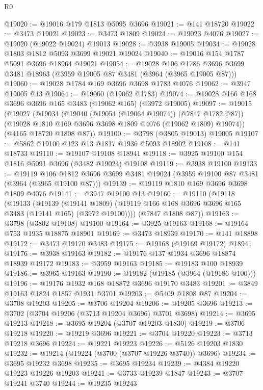 \begin{lexlean}{R0}
\begin{coremodule}
@19020 := @19016 @179 @1813 @5095 @3696
@19021 := @141 @18720
@19022 := @3473 @19021
@19023 := @3473 @1809
@19024 := @19023 @4076
@19027 := @19020 (@19022 @19024) @19013
@19028 := @3938 @19005
@19034 := @19028 @1803 @1812 @5093 @3699 @19021 @19024
@19040 := @19016 @154 @1787 @5091 @3696 @18964 @19021
@19054 := @19028
    @106
    @1786
    @3696
    @3699
    @3481
    @18963
    (@3959 @19005 @87 @3481 (@3964 (@3965 @19005 @87)))
@19060 := @19028 @1784 @169 @3696 @3698 @1783 @4076
@19062 := @3947 @19005 @13
@19064 := @19060 (@19062 @1783)
@19074 := @19028 @166 @168 @3696 @3696 @165 @3483 (@19062 @165) (@3972 @19005)
@19097 := @19015
    (@19027
      (@19034
        (@19040 (@19054 (@19064 @19074)) (@7847 @1782 @87))
        (@19028 @1810 @169 @3696 @3698 @1809 @4076 (@19062 @1809) @19074))
      (@4165 @18720 @1808 @87))
@19100 := @3798 (@3805 @19013) @19005
@19107 := @5862 @19100 @123 @13 @1817 @1936 @5093 @18902
@19108 := @141 @18733
@19110 := @19107 @19108 @18941
@19118 := @3925 @19100 @154 @1816 @5091 @3696 (@3482 @19024) @19108
@19119 := @3938 @19100
@19133 := @19119
    @106
    @1812
    @3696
    @3699
    @3481
    @19024
    (@3959 @19100 @87 @3481 (@3964 (@3965 @19100 @87)))
@19139 := @19119 @1810 @169 @3696 @3698 @1809 @4076
@19141 := @3947 @19100 @13
@19160 := @19110
    (@19118
      (@19133
        (@19139
          (@19141 @1809)
          (@19119 @166 @168 @3696 @3696 @165 @3483 (@19141 @165) (@3972 @19100))))
      (@7847 @1808 @87))
@19163 := @3798 (@3802 @19108) @19100
@19164 := @3925 @19163
@19168 := @19164 @753 @1935 @18875 @18901
@19169 := @3473 @18939
@19170 := @141 @18898
@19172 := @3473 @19170 @3483
@19175 := @19168 (@19169 @19172) @18941
@19176 := @3938 @19163
@19182 := @19176 @137 @1934 @3696 @18874 @18939 @19172
@19183 := @3959 @19163
@19185 := @19183 @100 @18939
@19186 := @3965 @19163
@19190 := @19182 (@19185 (@3964 (@19186 @100)))
@19196 := @19176 @1932 @168 @18872 @3696 @19170 @3483
@19201 := @3849 @19163 @1824 @1857 @1931 @3701
@19203 := @5409 @1808 @87
@19204 := @3708 @19203
@19205 := @3706 @19204
@19206 := @19205 @3696
@19213 := @3702 (@3704 @19206 (@3713 @19204 @3696) @3701 @3698)
@19214 := @3695 @19213
@19218 := @3695 @19204 (@3707 @19203 @1830)
@19219 := @3706 @19218
@19220 := @19219 @3696
@19221 := @3704 @19220
@19223 := @3713 @19218 @3696
@19224 := @19221 @19223
@19226 := @5126 @19203 @1830
@19232 := @19214 (@19224 (@3700 (@3707 @19226 @3740)) @3696)
@19234 := @3695 @19232 @3698
@19235 := @3695 @19234
@19239 := @4384 @19220 @19223 @19226 @19203
@19241 := @3733 @19239 @1847
@19243 := @3707 @19241 @3740
@19244 := @19235 @19243

\end{coremodule}
\end{lexlean}
